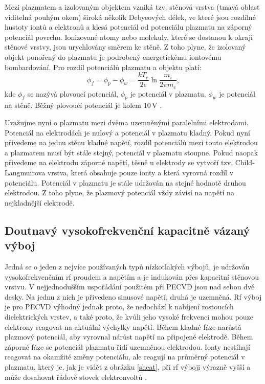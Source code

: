 \documentclass[12pt,oneside,final]{fithesis2}
\begin{document}
Mezi plazmatem a izolovaným objektem vzniká tzv. stěnová vrstva (tmavá oblast viditelná pouhým okem) široká několik Debyeových délek, ve které jsou rozdílné hustoty iontů a elektronů a klesá potenciál od potenciálu plazmatu na záporný potenciál povrchu. 
Ionizované atomy nebo molekuly, které se dostanou k okraji stěnové vrstvy, jsou urychlovány směrem ke stěně. Z toho plyne, že izolovaný objekt ponořený  do plazmatu je podrobený energetickému iontovému bombardování. Pro rozdíl potenciálů plazmatu a objektu platí:
\begin{equation} \phi_f = \phi_p - \phi_w = \frac{k T_e}{2 e} \ln{\frac{m_i}{2 \pi m_e}} \mathrm{,}\end{equation}
kde $\phi_f$ se nazývá plovoucí potenciál, $\phi_p$ je potenciál v plazmatu, $\phi_w$ je potenciál na stěně. Běžný plovoucí potenciál je kolem 10\,V \cite{smithsheet, bittencourtchapter11}. 

Uvažujme nyní o plazmatu mezi dvěma uzemněnými paralelními elektrodami. Potenciál na elektrodách je nulový a potenciál v plazmatu kladný. Pokud nyní přivedeme na jednu stěnu kladné napětí, rozdíl potenciálů mezi touto elektrodou a plazmatem musí být stále stejný, potenciál v plazmatu stoupne. Pokud naopak přivedeme na elektrodu záporné napětí, těsně u elektrody se vytvoří tzv. Child-Langmuirova vrstva, která obsahuje pouze ionty a která vyrovná rozdíl v potenciálu. Potenciál v plazmatu je stále udržován na stejné hodnotě druhou elektrodou. Z toho plyne, že plazmový potenciál vždy závisí na napětí na nejkladnější elektrodě.  

\subsection{Doutnavý vysokofrekvenční kapacitně vázaný výboj}
Jedná se o jeden z nejvíce používaných typů nízkotlakých výbojů, je udržován vysokofrekvenčním rf proudem a napětím a je indukován přes kapacitní stěnovou vrstvu. V nejjednodušším uspořádání použitém při PECVD jsou nad sebou dvě desky. Na jednu z nich je přivedeno sinusové napětí, druhá je uzemněná. Rf výboj je pro PECVD výhodný jednak proto, že nedochází k nabíjení rostoucích dielektrických vrstev, a také proto, že kvůli jeho vysoké frekvenci mohou pouze elektrony reagovat na aktuální výchylky napětí. Během kladné fáze narůstá plazmový potenciál, aby vyrovnal nárůst napětí na připojené elektrodě. Během záporné fáze se potenciál plazmatu řídí uzemněnou elektrodou. Ionty nestíhají reagovat na okamžité změny potenciálu, ale reagují na průměrný potenciál v plazmatu, který je, jak je vidět z obrázku \ref{sheat}, při rf výboji výrazně vyšší a může dosahovat řádově stovek elektronvoltů \cite{liebermandischarge, chen2003sheet}.
\end{document}
